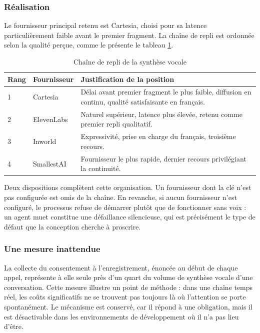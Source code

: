 \subsubsection{Réalisation}

Le fournisseur principal retenu est Cartesia, choisi pour sa latence particulièrement faible avant le premier fragment. La chaîne de repli est ordonnée selon la qualité perçue, comme le présente le tableau \ref{tab:tts-chaine}.

\begin{table}[H]
\centering
\renewcommand{\arraystretch}{1.25}
\begin{tabular}{|p{1.2cm}|p{3.2cm}|p{10.1cm}|}
\hline
\textbf{Rang} & \textbf{Fournisseur} & \textbf{Justification de la position} \\
\hline
1 & Cartesia & Délai avant premier fragment le plus faible, diffusion en continu, qualité satisfaisante en français. \\
\hline
2 & ElevenLabs & Naturel supérieur, latence plus élevée, retenu comme premier repli qualitatif. \\
\hline
3 & Inworld & Expressivité, prise en charge du français, troisième recours. \\
\hline
4 & SmallestAI & Fournisseur le plus rapide, dernier recours privilégiant la continuité. \\
\hline
\end{tabular}
\caption{Chaîne de repli de la synthèse vocale}
\label{tab:tts-chaine}
\end{table}

Deux dispositions complètent cette organisation. Un fournisseur dont la clé n'est pas configurée est omis de la chaîne. En revanche, si aucun fournisseur n'est configuré, le processus refuse de démarrer plutôt que de fonctionner sans voix : un agent muet constitue une défaillance silencieuse, qui est précisément le type de défaut que la conception cherche à proscrire.

\subsubsection{Une mesure inattendue}

La collecte du consentement à l'enregistrement, énoncée au début de chaque appel, représente à elle seule près d'un quart du volume de synthèse vocale d'une conversation. Cette mesure illustre un point de méthode : dans une chaîne temps réel, les coûts significatifs ne se trouvent pas toujours là où l'attention se porte spontanément. Le mécanisme est conservé, car il répond à une obligation, mais il est désactivable dans les environnements de développement où il n'a pas lieu d'être.

